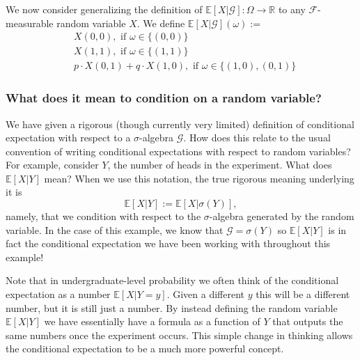 \documentclass[12pt]{article}
\newcommand{\E}{\mathbb{E}}
\newcommand{\R}{\mathbb{R}}
\begin{document}
We now consider generalizing the definition of $\E[X|\mathcal{G}]: \Omega \to \R$ to any $\mathcal{F}$-measurable random variable $X$. We define $\E[X|\mathcal{G}](\omega) := $
\begin{align*}
&X(0, 0), \text{ if } \omega \in \{(0, 0)\} \\
&X(1, 1), \text{ if } \omega \in \{(1, 1)\} \\
&p \cdot X(0, 1) + q \cdot X(1, 0), \text{ if } \omega \in \{(1, 0), (0, 1)\}
\end{align*}

\subsubsection{What does it mean to condition on a random variable?}
We have given a rigorous (though currently very limited) definition of conditional expectation with respect to a $\sigma$-algebra $\mathcal{G}$. How does this relate to the usual convention of writing conditional 
expectations with respect to random variables? For example, consider $Y$, the number of heads in the experiment. What does $\E[X|Y]$ mean? When we use this notation, the true rigorous meaning underlying it 
is 
\[\E[X|Y] := \E[X|\sigma(Y)],\]
namely, that we condition with respect to the $\sigma$-algebra generated by the random variable. In the case of this example, we know that $\mathcal{G} = \sigma(Y)$ so $\E[X|Y]$ is in fact the conditional expectation 
we have been working with throughout this example!

Note that in undergraduate-level probability we often think of the conditional expectation as a number $\E[X|Y = y]$. Given a different $y$ this will be a different number, but it  is still just a number. By instead defining the 
random variable $\E[X|Y]$ we have essentially have a formula as a function of $Y$ that outputs the same numbers once the experiment occurs. This simple change in thinking allows the conditional expectation to be a much 
more powerful concept. 
\end{document}
